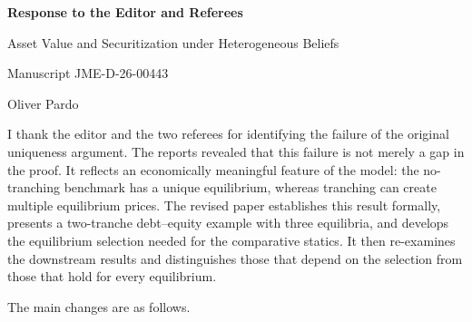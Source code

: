 \documentclass[11pt]{article}
\newcommand{\msnumber}{JME-D-26-00443}
\begin{document}
\begin{center}
{\Large\bfseries Response to the Editor and Referees}\par
\vspace{0.5em}
{\large Asset Value and Securitization under Heterogeneous Beliefs}\par
\vspace{0.25em}
Manuscript \msnumber\par
\vspace{0.25em}
Oliver Pardo
\end{center}

\bigskip

I thank the editor and the two referees for identifying the failure of the original uniqueness argument. The reports revealed that this failure is not merely a gap in the proof. It reflects an economically meaningful feature of the model: the no-tranching benchmark has a unique equilibrium, whereas tranching can create multiple equilibrium prices. The revised paper establishes this result formally, presents a two-tranche debt--equity example with three equilibria, and develops the equilibrium selection needed for the comparative statics. It then re-examines the downstream results and distinguishes those that depend on the selection from those that hold for every equilibrium.

The main changes are as follows.
\end{document}
